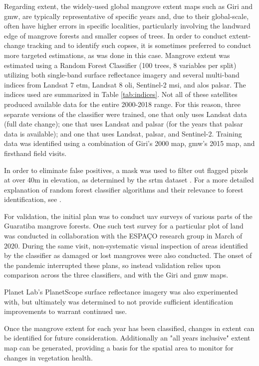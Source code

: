 Regarding extent, the widely-used global mangrove extent maps such as Giri and \ac{gmw}, are typically representative of specific years and, due to their global-scale, often have higher errors in specific localities, particularly involving the landward edge of mangrove forests and smaller copses of trees. In order to conduct extent-change tracking and to identify such copses, it is sometimes preferred to conduct more targeted estimations, as was done in this case. Mangrove extent was estimated using a Random Forest Classifier (100 trees, 8 variables per split) utilizing both single-band surface reflectance imagery and several multi-band indices from Landsat 7 \ac{etm}, Landsat 8 \ac{oli}, Sentinel-2 \ac{msi}, and \ac{alos} \ac{palsar}. The indices used are summarized in Table \ref{tab:indices}. Not all of these satellites produced available data for the entire 2000-2018 range. For this reason, three separate versions of the classifier were trained, one that only uses Landsat data (full date change); one that uses Landsat and \ac{palsar} (for the years that \ac{palsar} data is available); and one that uses Landsat, \ac{palsar}, and Sentinel-2. Training data was identified using a combination of Giri's 2000 map, \ac{gmw}'s 2015 map, and firsthand field visits. 

In order to eliminate false positives, a mask was used to filter out flagged pixels at over 40m in elevation, as determined by the \ac{srtm} dataset \cite{jarvisHolefilledSRTMGlobe2008}. For a more detailed explanation of random forest classifier algorithms and their relevance to forest identification, see \cite{jhonnerieRandomForestClassification2015}.

For validation, the initial plan was to conduct \ac{uav} surveys of various parts of the Guaratiba mangrove forests. One such test survey for a particular plot of land was conducted in collaboration with the ESPAÇO research group in March of 2020. During the same visit, non-systematic visual inspection of areas identified by the classifier as damaged or lost mangroves were also conducted. The onset of the pandemic interrupted these plans, so instead validation relies upon comparison across the three classifiers, and with the Giri and \ac{gmw} maps.

Planet Lab's PlanetScope surface reflectance imagery was also experimented with, but ultimately was determined to not provide sufficient identification improvements to warrant continued use. 

Once the mangrove extent for each year has been classified, changes in extent can be identified for future consideration. Additionally an "all years inclusive" extent map can be generated, providing a basis for the spatial area to monitor for changes in vegetation health. 


